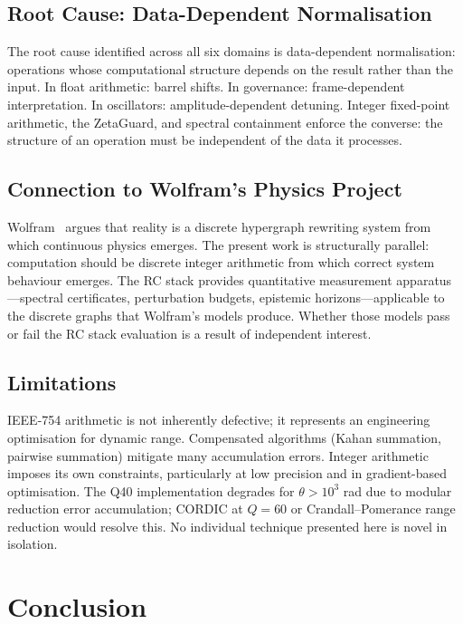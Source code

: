 \documentclass[10pt,twocolumn]{article}
\theoremstyle{definition}
\theoremstyle{remark}
\begin{document}
\subsection{Root Cause: Data-Dependent Normalisation}

The root cause identified across all six domains is data-dependent normalisation: operations whose computational structure depends on the result rather than the input.  In float arithmetic: barrel shifts.  In governance: frame-dependent interpretation.  In oscillators: amplitude-dependent detuning.  Integer fixed-point arithmetic, the ZetaGuard, and spectral containment enforce the converse: the structure of an operation must be independent of the data it processes.

\subsection{Connection to Wolfram's Physics Project}

Wolfram~\cite{Wolfram2020} argues that reality is a discrete hypergraph rewriting system from which continuous physics emerges.  The present work is structurally parallel: computation should be discrete integer arithmetic from which correct system behaviour emerges.  The RC stack provides quantitative measurement apparatus---spectral certificates, perturbation budgets, epistemic horizons---applicable to the discrete graphs that Wolfram's models produce.  Whether those models pass or fail the RC stack evaluation is a result of independent interest.

\subsection{Limitations}

IEEE-754 arithmetic is not inherently defective; it represents an engineering optimisation for dynamic range.  Compensated algorithms (Kahan summation, pairwise summation) mitigate many accumulation errors.  Integer arithmetic imposes its own constraints, particularly at low precision and in gradient-based optimisation.  The Q40 implementation degrades for $\theta > 10^3$ rad due to modular reduction error accumulation; CORDIC at $Q=60$ or Crandall--Pomerance range reduction would resolve this.  No individual technique presented here is novel in isolation.

\section{Conclusion}\label{sec:conclusion}
\end{document}
